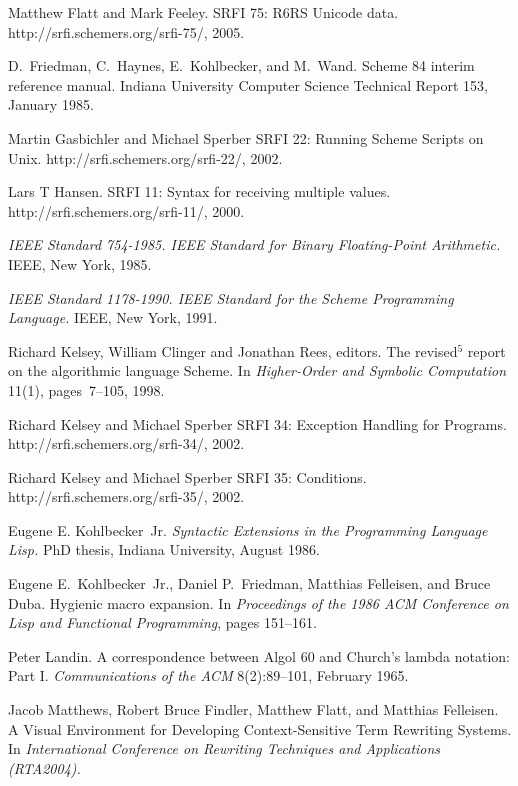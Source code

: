 \begin{thebibliography}{999}
Matthew Flatt and Mark Feeley.
SRFI 75: R6RS Unicode data.
{\cf http://srfi.schemers.org/\linebreak[1]srfi-75/}, 2005.

D.~Friedman, C.~Haynes, E.~Kohlbecker, and M.~Wand.
Scheme 84 interim reference manual.
Indiana University Computer Science Technical Report 153, January 1985.

Martin Gasbichler and Michael Sperber
SRFI 22: Running Scheme Scripts on Unix.
{\cf http://srfi.schemers.org/srfi-22/}, 2002.

Lars T Hansen.
SRFI 11: Syntax for receiving multiple values.
{\cf http://srfi.schemers.org/srfi-11/}, 2000.

{\em IEEE Standard 754-1985.  IEEE Standard for Binary Floating-Point
Arithmetic.}  IEEE, New York, 1985.

{\em IEEE Standard 1178-1990.  IEEE Standard for the Scheme
  Programming Language.}  IEEE, New York, 1991.

Richard Kelsey, William Clinger and Jonathan Rees, editors.
The revised$^5$ report on the algorithmic language Scheme.
In {\em Higher-Order and Symbolic Computation} 11(1), pages~7--105, 1998.

Richard Kelsey and Michael Sperber
SRFI 34: Exception Handling for Programs.
{\cf http://srfi.schemers.org/srfi-34/}, 2002.

Richard Kelsey and Michael Sperber
SRFI 35: Conditions.
{\cf http://srfi.schemers.org/srfi-35/}, 2002.

Eugene E. Kohlbecker~Jr.
{\em Syntactic Extensions in the Programming Language Lisp.}
PhD thesis, Indiana University, August 1986.

Eugene E.~Kohlbecker~Jr., Daniel P.~Friedman, Matthias Felleisen, and Bruce Duba.
Hygienic macro expansion.
In {\em Proceedings of the 1986 ACM Conference on Lisp
  and Functional Programming}, pages 151--161.

Peter Landin.
A correspondence between Algol 60 and Church's lambda notation: Part I.
{\em Communications of the ACM} 8(2):89--101, February 1965.

Jacob Matthews, Robert Bruce Findler, Matthew
  Flatt, and Matthias Felleisen.
A Visual Environment for Developing Context-Sensitive Term Rewriting Systems.
In {\em International Conference on Rewriting Techniques and Applications (RTA2004).}


\end{thebibliography}
